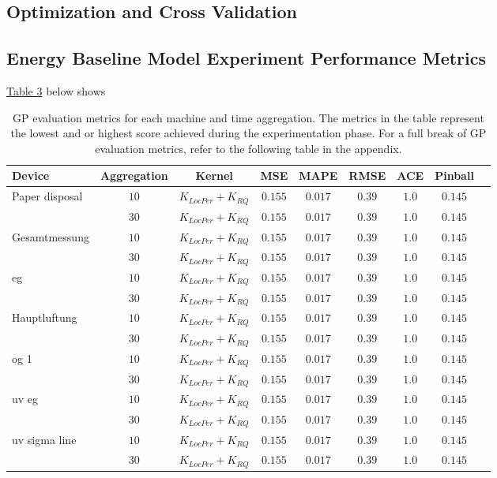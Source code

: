 \subsection{Optimization and Cross Validation}

\subsection{Energy Baseline Model Experiment Performance Metrics}

\hyperlink{table.3}{Table 3} below shows

\begin{table}[htbp]
    \renewcommand{\arraystretch}{1.2}
    \centering
    \begin{tabular}{lcccccccc}
    \hline
         Device & Aggregation & Kernel & MSE & MAPE & RMSE & ACE & Pinball  \\
    \hline
    Paper disposal & $10$ & $K_{LocPer} + K_{RQ}$ & $0.155$ & $0.017$ & $0.39$ & $1.0$ & $0.145$ \\
     & $30$ & $K_{LocPer} + K_{RQ}$ & $0.155$ & $0.017$ & $0.39$ & $1.0$ & $0.145$ \\
    Gesamtmessung & $10$ & $K_{LocPer} + K_{RQ}$ & $0.155$ & $0.017$ & $0.39$ & $1.0$ & $0.145$ \\
     & $30$ & $K_{LocPer} + K_{RQ}$ & $0.155$ & $0.017$ & $0.39$ & $1.0$ & $0.145$ \\
    eg & $10$ & $K_{LocPer} + K_{RQ}$ & $0.155$ & $0.017$ & $0.39$ & $1.0$ & $0.145$ \\
     & $30$ & $K_{LocPer} + K_{RQ}$ & $0.155$ & $0.017$ & $0.39$ & $1.0$ & $0.145$ \\
    Hauptluftung & $10$ & $K_{LocPer} + K_{RQ}$ & $0.155$ & $0.017$ & $0.39$ & $1.0$ & $0.145$ \\
     & $30$ & $K_{LocPer} + K_{RQ}$ & $0.155$ & $0.017$ & $0.39$ & $1.0$ & $0.145$ \\
    og 1 & $10$ & $K_{LocPer} + K_{RQ}$ & $0.155$ & $0.017$ & $0.39$ & $1.0$ & $0.145$ \\
     & $30$ & $K_{LocPer} + K_{RQ}$ & $0.155$ & $0.017$ & $0.39$ & $1.0$ & $0.145$ \\
    uv eg & $10$ & $K_{LocPer} + K_{RQ}$ & $0.155$ & $0.017$ & $0.39$ & $1.0$ & $0.145$ \\
     & $30$ & $K_{LocPer} + K_{RQ}$ & $0.155$ & $0.017$ & $0.39$ & $1.0$ & $0.145$ \\
    uv sigma line & $10$ & $K_{LocPer} + K_{RQ}$ & $0.155$ & $0.017$ & $0.39$ & $1.0$ & $0.145$ \\
     & $30$ & $K_{LocPer} + K_{RQ}$ & $0.155$ & $0.017$ & $0.39$ & $1.0$ & $0.145$ \\
    \hline
    \end{tabular}
    \caption{GP evaluation metrics for each machine and time aggregation. The metrics in the table represent the lowest and or highest score achieved during the experimentation phase. For a full break of GP evaluation metrics, refer to the following table in the appendix.}
    \label{tab:my_label}
\end{table}
